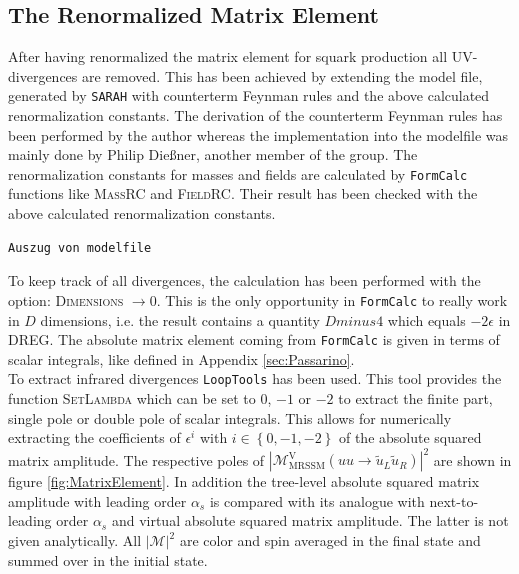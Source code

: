 \subsection{The Renormalized Matrix Element}
After having renormalized the matrix element for squark production all UV-divergences are removed. This has been achieved by extending the model file, generated by \texttt{SARAH} with counterterm Feynman rules and the above calculated renormalization constants. The derivation of the counterterm Feynman rules has been performed by the author whereas the implementation into the modelfile was mainly done by Philip Dießner, another member of the group. The renormalization constants for masses and fields are calculated by \texttt{FormCalc} functions like \textsc{MassRC} and \textsc{FieldRC}\cite{FormCalcManual}. Their result has been checked with the above calculated renormalization constants.\\
\begin{lstlisting}
Auszug von modelfile
\end{lstlisting}
To keep track of all divergences, the calculation has been performed with the option: \textsc{Dimensions} $\to 0$. This is the only opportunity in \texttt{FormCalc} to really work in $D$ dimensions, i.e. the result contains a quantity $Dminus4$ which equals $-2\epsilon$ in DREG. The absolute matrix element coming from \texttt{FormCalc} is given in terms of scalar integrals, like defined in Appendix \ref{sec:Passarino}.\\
To extract infrared divergences \texttt{LoopTools} has been used. This  tool provides the function \textsc{SetLambda} which can be set to 0, $-1$ or $-2$ to extract the finite part, single pole or double pole of  scalar integrals. This allows for numerically extracting the coefficients of $\epsilon^i$ with $i \in \left\{ 0,-1,-2 \right\}$ of the absolute squared matrix amplitude. The respective poles of $|\mathcal{M}^{\mathrm{V}}_{\mathrm{MRSSM}}(uu \to \tilde{u}_L\tilde{u}_R)|^2$ are shown in figure \ref{fig:MatrixElement}. In addition the tree-level absolute squared matrix amplitude with leading order $\alpha_s$ is compared with its analogue with next-to-leading order $\alpha_s$ and virtual absolute squared matrix amplitude. The latter is  not given analytically. All $|\mathcal{M}|^2$ are color and spin averaged in the final state and summed over in the initial state.
